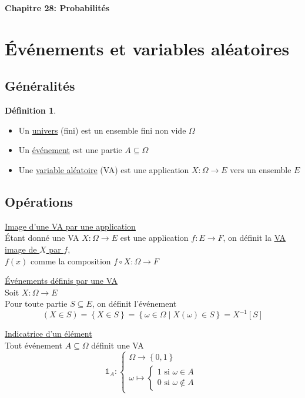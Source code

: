 \documentclass[10pt,a4paper]{article}
\theoremstyle{definition}
\newtheorem{definition}[proposition]{Définition}
\begin{document}
\renewcommand{\labelitemi}{$*$}
\begin{center}
{\Large \textbf{Chapitre 28: Probabilités}}
\end{center}

\section{Événements et variables aléatoires}
\subsection{Généralités}
\begin{definition}
\hfill
\begin{itemize}
\item Un \uline{univers} (fini) est un ensemble fini non vide $\Omega$
\item Un \uline{événement} est une partie $A \subseteq \Omega$
\item Une \uline{variable aléatoire} (VA) est une application $X: \Omega \to E$ vers un ensemble $E$
\end{itemize}
\end{definition}

\subsection{Opérations}
\noindent \uline{Image d'une VA par une application} \\
Étant donné une VA $X : \Omega \to E$ est une application $f: E \to F$, on définit la \uline{VA image de $X$ par $f$}, \\
$f(x)$ comme la composition $f \circ X: \Omega \to F$ \medskip

\noindent \uline{Événements définis par une VA} \\
Soit $X: \Omega \to E$ \\
Pour toute partie $S \subseteq E$, on définit l'événement
\[ (X \in S) = \left\{ X \in S \right\} = \left\{ \omega \in \Omega \mid X(\omega) \in S \right\} = X^{-1}[S] \] \medskip

\noindent \uline{Indicatrice d'un élément} \\
Tout événement $A \subseteq \Omega$ définit une VA
\[ \mathds{1}_A : \begin{cases}
\Omega \to \left\{ 0, 1 \right\} \\
\omega \mapsto \begin{cases}
1 \text{ si } \omega \in A \\
0 \text{ si } \omega \not\in A
\end{cases}
\end{cases} \]
\end{document}
